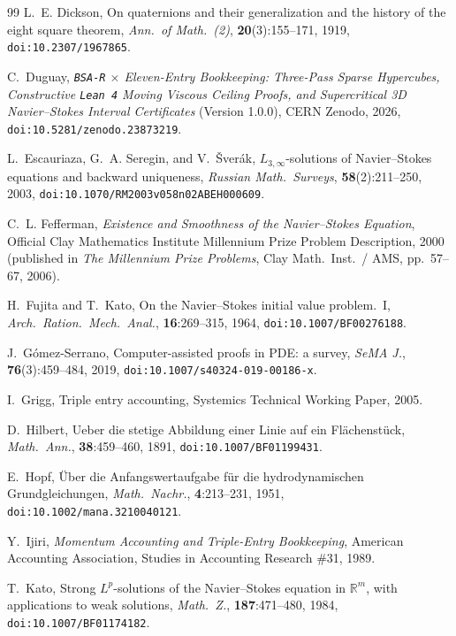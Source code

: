 \documentclass[11pt]{article}
\theoremstyle{plain}
\theoremstyle{definition}
\begin{document}
\begin{thebibliography}{99}
L.~E. Dickson,
On quaternions and their generalization and the history of the eight square theorem,
\emph{Ann.\ of Math.\ (2)}, \textbf{20}(3):155--171, 1919, \texttt{doi:10.2307/1967865}.

C.~Duguay,
\emph{\texttt{BSA-R} $\times$ Eleven-Entry Bookkeeping: Three-Pass Sparse Hypercubes, Constructive \texttt{Lean 4} Moving Viscous Ceiling Proofs, and Supercritical 3D Navier--Stokes Interval Certificates} (Version 1.0.0),
CERN Zenodo, 2026, \texttt{doi:10.5281/zenodo.23873219}.

L.~Escauriaza, G.~A. Seregin, and V.~\v{S}ver\'ak,
$L_{3,\infty}$-solutions of Navier--Stokes equations and backward uniqueness,
\emph{Russian Math.\ Surveys}, \textbf{58}(2):211--250, 2003, \texttt{doi:10.1070/RM2003v058n02ABEH000609}.

C.~L. Fefferman,
\emph{Existence and Smoothness of the Navier--Stokes Equation},
Official Clay Mathematics Institute Millennium Prize Problem Description, 2000 (published in \emph{The Millennium Prize Problems}, Clay Math.\ Inst.\ / AMS, pp.~57--67, 2006).

H.~Fujita and T.~Kato,
On the Navier--Stokes initial value problem.\ I,
\emph{Arch.\ Ration.\ Mech.\ Anal.}, \textbf{16}:269--315, 1964, \texttt{doi:10.1007/BF00276188}.

J.~G\'omez-Serrano,
Computer-assisted proofs in PDE: a survey,
\emph{SeMA J.}, \textbf{76}(3):459--484, 2019, \texttt{doi:10.1007/s40324-019-00186-x}.

I.~Grigg,
Triple entry accounting,
Systemics Technical Working Paper, 2005.

D.~Hilbert,
Ueber die stetige Abbildung einer Linie auf ein Fl\"achenst\"uck,
\emph{Math.\ Ann.}, \textbf{38}:459--460, 1891, \texttt{doi:10.1007/BF01199431}.

E.~Hopf,
\"Uber die Anfangswertaufgabe f\"ur die hydrodynamischen Grundgleichungen,
\emph{Math.\ Nachr.}, \textbf{4}:213--231, 1951, \texttt{doi:10.1002/mana.3210040121}.

Y.~Ijiri,
\emph{Momentum Accounting and Triple-Entry Bookkeeping},
American Accounting Association, Studies in Accounting Research \#31, 1989.

T.~Kato,
Strong $L^p$-solutions of the Navier--Stokes equation in $\mathbb{R}^m$, with applications to weak solutions,
\emph{Math.\ Z.}, \textbf{187}:471--480, 1984, \texttt{doi:10.1007/BF01174182}.


\end{thebibliography}
\end{document}
